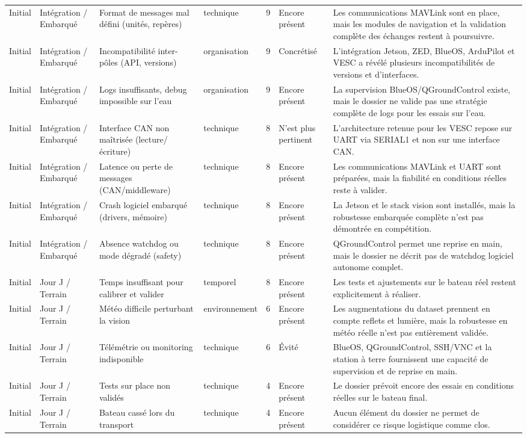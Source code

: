 \documentclass[11pt,letterpaper]{article}
\begin{document}
\begin{longtable}{@{}L{1.55cm}L{2.05cm}L{3.25cm}L{1.95cm}L{1.05cm}L{2.15cm}L{3.55cm}@{}}
    Initial & Intégration / Embarqué & Format de messages mal défini (unités, repères) & technique & 9 & Encore présent & Les communications MAVLink sont en place, mais les modules de navigation et la validation complète des échanges restent à poursuivre. \\
    Initial & Intégration / Embarqué & Incompatibilité inter-pôles (API, versions) & organisation & 9 & Concrétisé & L'intégration Jetson, ZED, BlueOS, ArduPilot et VESC a révélé plusieurs incompatibilités de versions et d'interfaces. \\
    Initial & Intégration / Embarqué & Logs insuffisants, debug impossible sur l'eau & organisation & 9 & Encore présent & La supervision BlueOS/QGroundControl existe, mais le dossier ne valide pas une stratégie complète de logs pour les essais sur l'eau. \\
    Initial & Intégration / Embarqué & Interface CAN non maîtrisée (lecture/écriture) & technique & 8 & N'est plus pertinent & L'architecture retenue pour les VESC repose sur UART via SERIAL1 et non sur une interface CAN. \\
    Initial & Intégration / Embarqué & Latence ou perte de messages (CAN/middleware) & technique & 8 & Encore présent & Les communications MAVLink et UART sont préparées, mais la fiabilité en conditions réelles reste à valider. \\
    Initial & Intégration / Embarqué & Crash logiciel embarqué (drivers, mémoire) & technique & 8 & Encore présent & La Jetson et le stack vision sont installés, mais la robustesse embarquée complète n'est pas démontrée en compétition. \\
    Initial & Intégration / Embarqué & Absence watchdog ou mode dégradé (safety) & technique & 8 & Encore présent & QGroundControl permet une reprise en main, mais le dossier ne décrit pas de watchdog logiciel autonome complet. \\

    Initial & Jour J / Terrain & Temps insuffisant pour calibrer et valider & temporel & 8 & Encore présent & Les tests et ajustements sur le bateau réel restent explicitement à réaliser. \\
    Initial & Jour J / Terrain & Météo difficile perturbant la vision & environnement & 6 & Encore présent & Les augmentations du dataset prennent en compte reflets et lumière, mais la robustesse en météo réelle n'est pas entièrement validée. \\
    Initial & Jour J / Terrain & Télémétrie ou monitoring indisponible & technique & 6 & Évité & BlueOS, QGroundControl, SSH/VNC et la station à terre fournissent une capacité de supervision et de reprise en main. \\
    Initial & Jour J / Terrain & Tests sur place non validés & technique & 4 & Encore présent & Le dossier prévoit encore des essais en conditions réelles sur le bateau final. \\
    Initial & Jour J / Terrain & Bateau cassé lors du transport & technique & 4 & Encore présent & Aucun élément du dossier ne permet de considérer ce risque logistique comme clos. \\


\end{longtable}
\end{document}
